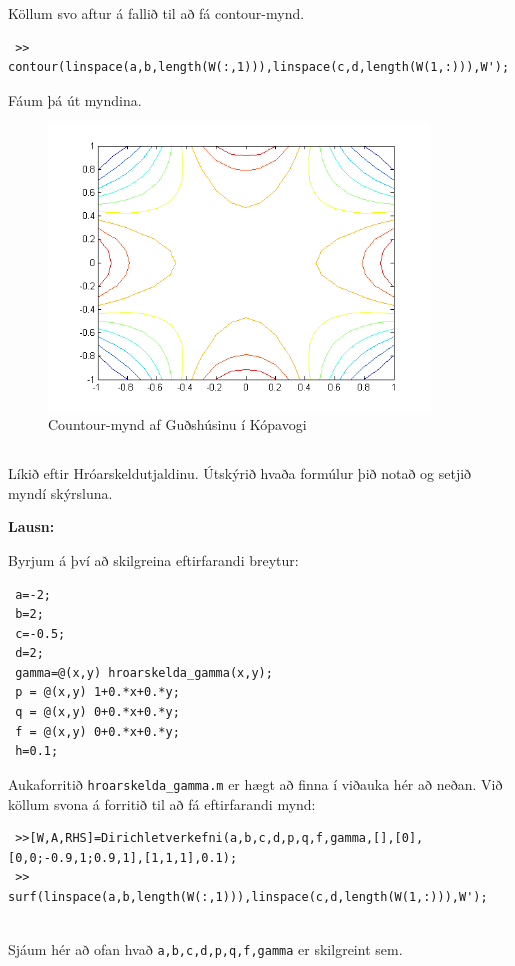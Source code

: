 \documentclass[11pt,a4paper,titlepage]{article}
\begin{document}
  
 Köllum svo aftur á fallið til að fá contour-mynd.
 \begin{verbatim}
 >> contour(linspace(a,b,length(W(:,1))),linspace(c,d,length(W(1,:))),W');
 \end{verbatim}
 
 Fáum þá út myndina.
 
 \begin{figure}[h!]
       \centering
       \includegraphics[width=0.9\textwidth]{gudshusid_contour.png}
       \caption{Countour-mynd af Guðshúsinu í Kópavogi}
       \label{fig:awesome_image8}
   \end{figure}
   
\newpage
 
 \subsection{}
 Líkið eftir Hróarskeldutjaldinu. Útskýrið hvaða formúlur þið notað og setjið myndí skýrsluna. 
 
 \par
 \textbf{Lausn:}\par
 
 Byrjum á því að skilgreina eftirfarandi breytur:
 \begin{verbatim}
 a=-2;
 b=2;
 c=-0.5;
 d=2;
 gamma=@(x,y) hroarskelda_gamma(x,y);
 p = @(x,y) 1+0.*x+0.*y;
 q = @(x,y) 0+0.*x+0.*y;
 f = @(x,y) 0+0.*x+0.*y;
 h=0.1;
 \end{verbatim}
 Aukaforritið   \verb|hroarskelda_gamma.m| er hægt að finna í viðauka hér að neðan.  Við köllum svona á forritið til að fá eftirfarandi mynd:
 \begin{verbatim}
 >>[W,A,RHS]=Dirichletverkefni(a,b,c,d,p,q,f,gamma,[],[0],[0,0;-0.9,1;0.9,1],[1,1,1],0.1);
 >> surf(linspace(a,b,length(W(:,1))),linspace(c,d,length(W(1,:))),W');
 
 \end{verbatim}
 Sjáum hér að ofan hvað  \verb|a,b,c,d,p,q,f,gamma| er skilgreint sem. 
 
\end{document}
